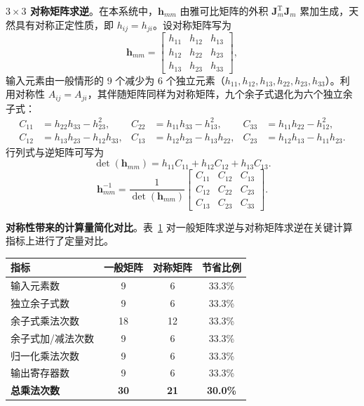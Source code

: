 \textbf{$3\times3$ 对称矩阵求逆}。在本系统中，$\mathbf{h}_{mm}$ 由雅可比矩阵的外积 $\mathbf{J}_m^{\mathrm{T}}\mathbf{J}_m$ 累加生成，天然具有对称正定性质，即 $h_{ij}=h_{ji}$。设对称矩阵写为
\begin{equation}
\mathbf{h}_{mm}=\begin{bmatrix}
 h_{11} & h_{12} & h_{13} \\
 h_{12} & h_{22} & h_{23} \\
 h_{13} & h_{23} & h_{33}
\end{bmatrix},
\end{equation}
输入元素由一般情形的 9 个减少为 6 个独立元素（$h_{11}, h_{12}, h_{13}, h_{22}, h_{23}, h_{33}$）。利用对称性 $A_{ij}=A_{ji}$，其伴随矩阵同样为对称矩阵，九个余子式退化为六个独立余子式：
\begin{equation}
\begin{aligned}
C_{11} &= h_{22}h_{33}-h_{23}^2, & C_{22} &= h_{11}h_{33}-h_{13}^2, & C_{33} &= h_{11}h_{22}-h_{12}^2, \\
C_{12} &= h_{13}h_{23}-h_{12}h_{33}, & C_{13} &= h_{12}h_{23}-h_{13}h_{22}, & C_{23} &= h_{12}h_{13}-h_{11}h_{23}.
\end{aligned}
\end{equation}
行列式与逆矩阵可写为
\begin{equation}
\det(\mathbf{h}_{mm})=h_{11}C_{11}+h_{12}C_{12}+h_{13}C_{13}.
\end{equation}
\begin{equation}
\mathbf{h}_{mm}^{-1}=\frac{1}{\det(\mathbf{h}_{mm})}
\begin{bmatrix}
C_{11} & C_{12} & C_{13} \\
C_{12} & C_{22} & C_{23} \\
C_{13} & C_{23} & C_{33}
\end{bmatrix}.
\end{equation}

\textbf{对称性带来的计算量简化对比}。表~\ref{tab:inv_comparison} 对一般矩阵求逆与对称矩阵求逆在关键计算指标上进行了定量对比。

\begin{table}[htbp]
\centering
{}
\label{tab:inv_comparison}
\begin{tabular}{lccc}
\toprule
\textbf{指标} & \textbf{一般矩阵} & \textbf{对称矩阵} & \textbf{节省比例} \\
\midrule
输入元素数 & 9 & 6 & 33.3\% \\
独立余子式数 & 9 & 6 & 33.3\% \\
余子式乘法次数 & 18 & 12 & 33.3\% \\
余子式加/减法次数 & 9 & 6 & 33.3\% \\
归一化乘法次数 & 9 & 6 & 33.3\% \\
输出寄存器数 & 9 & 6 & 33.3\% \\
\textbf{总乘法次数} & \textbf{30} & \textbf{21} & \textbf{30.0\%} \\
\bottomrule
\end{tabular}
\end{table}

